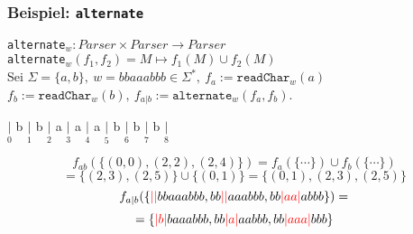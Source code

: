 \documentclass{beamer}
\newcommand{\red}[1]{\textcolor{red}{#1}}
\begin{document}
    \begin{frame}[t]
        \frametitle{\textbf{Beispiel:} \texttt{alternate}}
        \texttt{alternate}$_w : Parser \times Parser \to Parser$\\
        \texttt{alternate}$_w(f_1,f_2) = M \mapsto f_1(M) \cup f_2(M)$\\[10pt]
        Sei $\Sigma = \{a,b\},\ w = bbaaabbb \in \Sigma^*,\ f_a := \texttt{readChar}_w(a)$\\
        $f_b := \texttt{readChar}_w(b),\ f_{a|b} := \texttt{alternate}_w(f_a,f_b)$.\\
        \begin{center}
            $\underset{0}{|}$
                {\Large b}
            $\underset{1}{|}$
                {\Large b}
            $\underset{2}{|}$
                {\Large a}
            $\underset{3}{|}$
                {\Large a}
            $\underset{4}{|}$
                {\Large a}
            $\underset{5}{|}$
                {\Large b}
            $\underset{6}{|}$
                {\Large b}
            $\underset{7}{|}$
                {\Large b}
            $\underset{8}{|}$\\[30pt]
        \end{center}
        \pause
        $$
            f_{ab}(\{(0,0), (2,2), (2,4)\})
            = f_a(\{\cdots\}) \cup f_b(\{\cdots\})
        $$$$
            = \{(2,3),(2,5)\} \cup \{(0,1)\}
            = \{(0,1),(2,3),(2,5)\}
        $$
        \pause
        $$
            f_{a|b}(\{\red{||}bbaaabbb, bb\red{||}aaabbb, bb\red{|aa|}abbb\}) =
        $$$$
            = \{\red{|b|}baaabbb, bb\red{|a|}aabbb, bb\red{|aaa|}bbb\}
        $$
    \end{frame}

\end{document}

